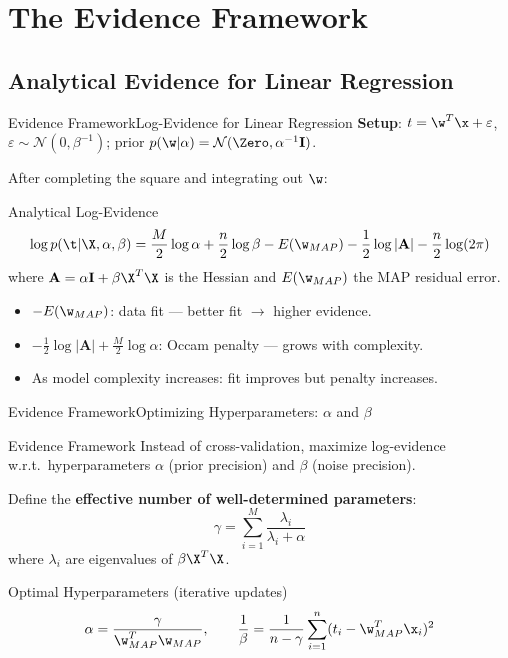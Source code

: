 \section{The Evidence Framework}

\subsection{Analytical Evidence for Linear Regression}

\begin{frame}{Evidence Framework}{Log-Evidence for Linear Regression}
  \textbf{Setup}: $t = \w^T\x + \varepsilon$, $\varepsilon \sim \mathcal{N}(0,\beta^{-1})$; prior $p(\w|\alpha) = \mathcal{N}(\Zero,\alpha^{-1}\mathbf{I})$.

  After completing the square and integrating out $\w$:

  \begin{block}{Analytical Log-Evidence}
    \[
      \log p(\t|\X,\alpha,\beta) = \frac{M}{2}\log\alpha + \frac{n}{2}\log\beta - E(\w_{MAP}) - \frac{1}{2}\log|\mathbf{A}| - \frac{n}{2}\log(2\pi)
    \]
    where $\mathbf{A} = \alpha\mathbf{I} + \beta\X^T\X$ is the Hessian and $E(\w_{MAP})$ the MAP residual error.
  \end{block}

  \begin{itemize}
    \item $-E(\w_{MAP})$: data fit — better fit $\to$ higher evidence.
    \item $-\frac{1}{2}\log|\mathbf{A}| + \frac{M}{2}\log\alpha$: Occam penalty — grows with complexity.
    \item As model complexity increases: fit improves but penalty increases.
  \end{itemize}
\end{frame}

\begin{frame}{Evidence Framework}{Optimizing Hyperparameters: $\alpha$ and $\beta$}
  \begin{block}{Evidence Framework}
    Instead of cross-validation, maximize log-evidence w.r.t.\ hyperparameters $\alpha$ (prior precision) and $\beta$ (noise precision).
  \end{block}

  Define the \textbf{effective number of well-determined parameters}:
  \[
    \gamma = \sum_{i=1}^M \frac{\lambda_i}{\lambda_i + \alpha}
  \]
  where $\lambda_i$ are eigenvalues of $\beta\X^T\X$.

  \begin{block}{Optimal Hyperparameters (iterative updates)}
    \[
      \alpha = \frac{\gamma}{\w_{MAP}^T\w_{MAP}}, \qquad \frac{1}{\beta} = \frac{1}{n-\gamma}\sum_{i=1}^n(t_i - \w_{MAP}^T\x_i)^2
    \]
  \end{block}
\end{frame}

